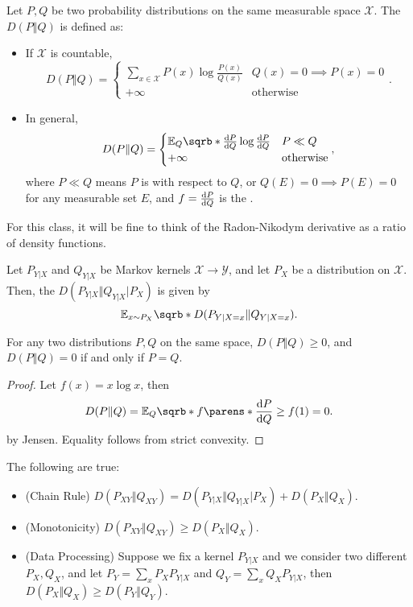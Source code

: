 \begin{defn}
	Let $P,Q$ be two probability distributions on the same measurable space $\mathcal X$.
	The  $D(P\Vert Q)$ is defined as:
	\begin{itemize}
		\item If $\mathcal X$ is countable, \[
				D(P\Vert Q) = \begin{cases}
					\sum\limits_{x\in \mathcal X} P(x) \log \frac{P(x)}{Q(x)} & Q(x) = 0\implies P(x) = 0\\
					+\infty & \text{otherwise}
				\end{cases}.
			\]
		\item In general, \[
				D(P\Vert Q) = \begin{cases}
					\mathbb E_Q \sqrb*{\frac{\text dP}{\text dQ} \log \frac{\text dP}{\text dQ}} & P \ll Q \\
					+\infty & \text{otherwise}
				\end{cases},
			\]
			where $P\ll Q$ means $P$ is  with respect to $Q$, or $Q(E) = 0\implies P(E) = 0$ for any measurable set $E$,
			and $f = \frac{\text dP}{\text dQ}$ is the .
	\end{itemize}
\end{defn}

For this class, it will be fine to think of the Radon-Nikodym derivative as a ratio of density functions.

\begin{defn}
	Let $P_{Y|X}$ and $Q_{Y|X}$ be Markov kernels $\mathcal X\to \mathcal Y$, and let $P_X$ be a distribution on $\mathcal X$. Then, the  $D(P_{Y|X} \Vert Q_{Y|X} | P_X)$ is given by \[
		\mathbb E_{x\sim P_X} \sqrb*{D(P_{Y|X=x}\Vert Q_{Y|X=x})}.
	\]
\end{defn}

\begin{thm}
	For any two distributions $P,Q$ on the same space, $D(P\Vert Q) \geq 0$, and $D(P\Vert Q) =0$ if and only if $P = Q$.
\end{thm}

\begin{proof}
	Let $f(x) = x\log x$, then \[
		D(P\Vert Q) = \mathbb E_Q \sqrb*{f\parens*{\frac{\text dP}{\text dQ}}} \geq f(1) = 0.
	\]
	by Jensen. Equality follows from strict convexity.
\end{proof}

\begin{fact}
	The following are true:
	\begin{itemize}
		\item (Chain Rule) $D(P_{XY}\Vert Q_{XY}) = D(P_{Y|X} \Vert Q_{Y|X} | P_X) + D(P_X\Vert Q_X)$.
		\item (Monotonicity) $D(P_{XY}\Vert Q_{XY}) \geq D(P_X\Vert Q_X)$.
		\item (Data Processing) Suppose we fix a kernel $P_{Y|X}$ and we consider two different $P_X, Q_X$, and let $P_Y = \sum_x P_XP_{Y|X}$ and $Q_Y = \sum_x Q_XP_{Y|X}$, then $D(P_X\Vert Q_X) \geq D(P_Y\Vert Q_Y)$.
	\end{itemize}
\end{fact}

